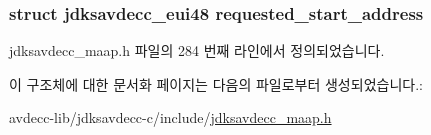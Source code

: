 \subsubsection[{\texorpdfstring{requested\+\_\+start\+\_\+address}{requested_start_address}}]{\setlength{\rightskip}{0pt plus 5cm}struct {\bf jdksavdecc\+\_\+eui48} requested\+\_\+start\+\_\+address}\hypertarget{structjdksavdecc__maap_a89e8561b4567080302ee157bb8d1e6c6}{}\label{structjdksavdecc__maap_a89e8561b4567080302ee157bb8d1e6c6}


jdksavdecc\+\_\+maap.\+h 파일의 284 번째 라인에서 정의되었습니다.



이 구조체에 대한 문서화 페이지는 다음의 파일로부터 생성되었습니다.\+:\begin{DoxyCompactItemize}
\item 
avdecc-\/lib/jdksavdecc-\/c/include/\hyperlink{jdksavdecc__maap_8h}{jdksavdecc\+\_\+maap.\+h}\end{DoxyCompactItemize}
